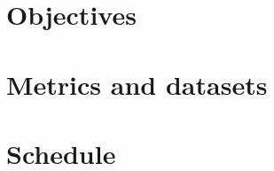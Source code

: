     \label{sec:data-carving-existing-tools}
    

    \label{sec:data-carving-challenges}
    
    
    \section{Objectives}
    
    
    \section{Metrics and datasets}
    
    
    \section{Schedule}
    



